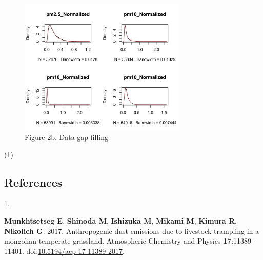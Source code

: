 \documentclass[
  11pt,
]{article}
\newlength{\cslhangindent}
\newlength{\csllabelwidth}
\newenvironment{CSLReferences}[2] %
 {\begin{list}{}{%
  \setlength{\itemindent}{0pt}
  \setlength{\leftmargin}{0pt}
  \setlength{\parsep}{0pt}
  \ifodd #1
   \setlength{\leftmargin}{\cslhangindent}
   \setlength{\itemindent}{-1\cslhangindent}
  \fi
  \setlength{\itemsep}{#2\baselineskip}}}
 {\end{list}}
\newcommand{\CSLLeftMargin}[1]{\parbox[t]{\csllabelwidth}{\strut#1\strut}}
\newcommand{\CSLRightInline}[1]{\parbox[t]{\linewidth - \csllabelwidth}{\strut#1\strut}}
\begin{document}
\begin{figure}
\centering
\includegraphics[width=3.125in,height=\textheight,keepaspectratio]{images/figure_2c.png}
\caption{Figure 2b. Data gap filling}
\end{figure}

(1)

\newpage

\subsection*{References}\label{references}

\label{refs}
\begin{CSLReferences}{0}{1}
\CSLLeftMargin{1. }%
\CSLRightInline{\textbf{Munkhtsetseg E}, \textbf{Shinoda M},
\textbf{Ishizuka M}, \textbf{Mikami M}, \textbf{Kimura R},
\textbf{Nikolich G}. 2017. Anthropogenic dust emissions due to livestock
trampling in a mongolian temperate grassland. Atmospheric Chemistry and
Physics \textbf{17}:11389--11401.
doi:\href{https://doi.org/10.5194/acp-17-11389-2017}{10.5194/acp-17-11389-2017}.}

\end{CSLReferences}
\end{document}
